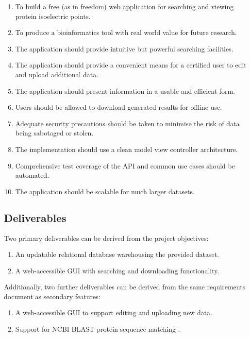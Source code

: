 \begin{enumerate}
\item To build a free (as in freedom) web application for searching and viewing
  protein isoelectric points.
\item To produce a bioinformatics tool with real world value for future
  research.
\item The application should provide intuitive but powerful searching
  facilities.
\item The application should provide a convenient means for a certified user to
  edit and upload additional data.
\item The application should present information in a usable and efficient form.
\item Users should be allowed to download generated results for offline use.
\item Adequate security precautions should be taken to minimise the risk of data
  being sabotaged or stolen.
\item The implementation should use a clean model view controller architecture.
\item Comprehensive test coverage of the API and common use cases should be
  automated.
\item The application should be scalable for much larger datasets.
\end{enumerate}

\subsection{Deliverables}
Two primary deliverables can be derived from the project objectives:

\begin{enumerate}
\item An updatable relational database warehousing the provided dataset.
\item A web-accessible GUI with searching and downloading functionality.
\end{enumerate}

Additionally, two further deliverables can be derived from the same requirements
document as secondary features:

\begin{enumerate}
\item A web-accessible GUI to support editing and uploading new data.
\item Support for NCBI BLAST protein sequence matching \cite{NCBIND}.
\end{enumerate}

